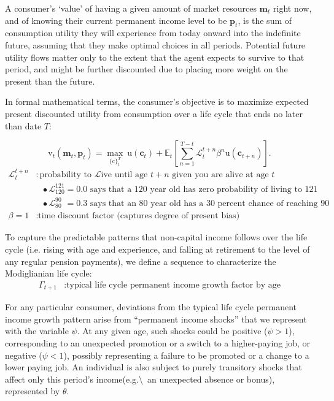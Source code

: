 \documentclass{article}
\newcommand{\uFunc}{\mathrm{u}}
\newcommand{\cLvl}{\mathbf{c}}
\newcommand{\mLvl}{\mathbf{m}}
\newcommand{\pLvl}{\mathbf{p}}
\newcommand{\DiscFac}{\beta}
\newcommand{\cFunc}{\mathrm{c}}
\newcommand{\vFunc}{\mathrm{v}}
\newcommand{\Alive}{\mathcal{L}}
\newcommand{\Ex}{\mathbb{E}}
\newcommand{\permGroFac}{\Gamma}
\newcommand{\permShk}{\psi}
\newcommand{\tranShk}{\theta}
\begin{document}
A consumer's `value' of having a given amount of market resources $\mLvl_{t}$ right now, and of knowing their current permanent income level to be $\pLvl_{t}$, is the sum of consumption utility they will experience from today onward into the indefinite future, assuming that they make optimal choices in all periods.
Potential future utility flows matter only to the extent that the agent expects to survive to that period, and might be further discounted due to placing more weight on the present than the future.

In formal mathematical terms, the consumer's objective is to maximize expected present discounted utility from consumption over a life cycle that ends no later than date $T$:

\begin{equation}
\label{eq:lifecyclemax}
\pmb{\vFunc}_{t}(\mLvl_{t},\pLvl_{t}) = \max_{\{\cFunc\}_{t}^{T}} ~ \uFunc(\cLvl_{t})+\Ex_{t}\left[\sum_{n=1}^{T-t} \Alive_{t}^{t+n}{\DiscFac}^{n} \uFunc(\cLvl_{t+n}) \right].
\end{equation}
\begin{align*}
    \Alive _{t}^{t+n} & : \text{probability to } \Alive \text{ive until age $t+n$ given you are alive at age $t$}
    \\                   & {~~~}\bullet \Alive_{120}^{121} = 0.0 \text{ says that a 120 year old has zero probability of living to 121}
    \\                   & {~~~}\bullet \Alive_{80\phantom{1}}^{90\phantom{1}} = 0.3 \text{ says that an 80 year old has a 30 percent chance of reaching 90}
    \\ \DiscFac = 1        & : \text{time discount factor (captures degree of present bias)}
\end{align*}

To capture the predictable patterns that non-capital income follows over the life cycle (i.e. rising with age and experience, and falling at retirement to the level of any regular pension payments), we define a sequence to characterize the Modiglianian life cycle:
\begin{align}
    \permGroFac_{t+1} & : \text{typical life cycle permanent income growth factor by age}
\end{align}

For any particular consumer, deviations from the typical life cycle permanent income growth pattern arise from ``permanent income shocks'' that we represent with the variable $\permShk$.
At any given age, such shocks could be positive ($\psi>1$), corresponding to an unexpected promotion or a switch to a higher-paying job, or negative ($\psi < 1$), possibly representing a failure to be promoted or a change to a lower paying job.
An individual is also subject to purely transitory shocks that affect only this period's income(e.g.{\textbackslash}~an unexpected absence or bonus), represented by $\tranShk$.
\end{document}
